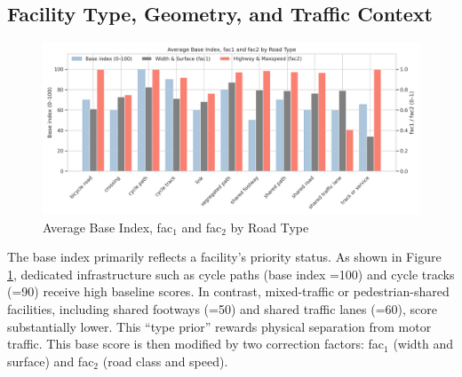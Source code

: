 \documentclass[
  12pt,
  oneside]{book}
\begin{document}
\subsection{Facility Type, Geometry, and Traffic Context}\label{facility-type-geometry-and-traffic-context}

\begin{figure}

{\centering \includegraphics[width=0.95\linewidth]{general_images/fac1_2} 

}

\caption{Average Base Index, fac$_1$ and fac$_2$ by Road Type}\label{fig:fac12}
\end{figure}

The base index primarily reflects a facility's priority status. As shown in Figure \ref{fig:fac12}, dedicated infrastructure such as cycle paths (base index =100) and cycle tracks (=90) receive high baseline scores. In contrast, mixed-traffic or pedestrian-shared facilities, including shared footways (=50) and shared traffic lanes (=60), score substantially lower. This ``type prior'' rewards physical separation from motor traffic. This base score is then modified by two correction factors: fac\(_1\) (width and surface) and fac\(_2\) (road class and speed).
\end{document}
